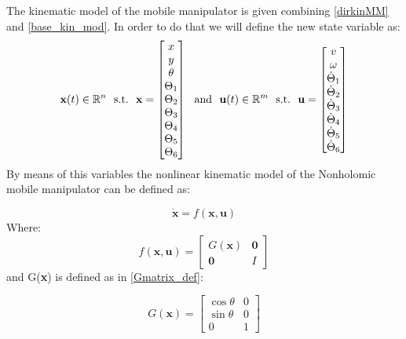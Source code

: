 The kinematic model of the mobile manipulator is given combining \ref{dirkinMM} and \ref{base_kin_mod}. In order to do that we will define the new state variable as:
\begin{equation}
\textbf{x}(t) \in \mathbb{R}^n\ \  \textnormal{s.t.}\ \  \textbf{x}  = \left[ \begin{matrix} x \\ y \\ \theta \\ \Theta_1 \\ \Theta_2 \\ \Theta_3 \\ \Theta_4 \\ \Theta_5 \\ \Theta_6 \end{matrix} \right]\ \   \textnormal{and}\ \  \textbf{u}(t) \in \mathbb{R}^m\ \ \textnormal{s.t.}\ \ \textbf{u}=\left[ \begin{matrix} v \\ \omega \\ \dot{\Theta}_1 \\ \dot{\Theta}_2 \\ \dot{\Theta}_3 \\ \dot{\Theta}_4 \\ \dot{\Theta}_5 \\ \dot{\Theta}_6 \end{matrix} \right]
\end{equation}
By means of this variables the nonlinear kinematic model of the Nonholomic mobile manipulator can be defined as:

\begin{equation}
	\dot{\textbf{x}}=f(\textbf{x},\textbf{u})
\end{equation} 
Where:
\begin{equation} \label{NLsystem}
	f(\textbf{x},\textbf{u}) = \left[ \begin{matrix}
	G(\textbf{x}) & \textbf{0} \\ \textbf{0} & I \end{matrix} \right]
\end{equation}
and G(\textbf{x}) is defined as in \ref{Gmatrix_def}:

\begin{equation}
G(\textbf{x}) =  \left[
\begin{matrix}
\cos\theta & 0 \\
\sin\theta & 0 \\
0 & 1 
\end{matrix}
\right] 
\end{equation}

